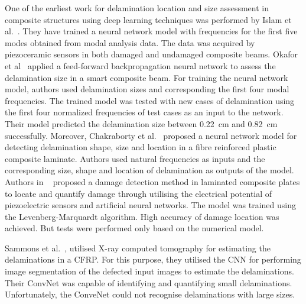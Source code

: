 \documentclass[preprint,9pt]{elsarticle}
\begin{document}
One of the earliest work for delamination location and size assessment in composite structures using deep learning techniques was performed by Islam et al.~\cite{islam1994damage}. 
They have trained a neural network model with frequencies for the first five modes obtained from modal analysis data. 
The data was acquired by piezoceramic sensors in both damaged and undamaged composite beams.
 Okafor et al~\cite{okafor1996delamination} applied a feed-forward backpropagation neural network to assess the delamination size in a smart composite beam. 
 For training the neural network model, authors used delamination sizes and corresponding the first four modal frequencies. 
 The trained model was tested with new cases of delamination using the first four normalized frequencies of test cases as an input to the network. 
 Their model predicted the delamination size between 0.22~cm and 0.82~cm successfully.
 Moreover, Chakraborty et al.~\cite{chakraborty2005artificial} proposed a neural network model for detecting delamination shape, size and location in a fibre reinforced plastic composite laminate.
 Authors used natural frequencies as inputs and the corresponding size, shape and location of delamination as outputs of the model. 
 Authors in ~\cite{roseiro2005neural}  proposed a damage detection method in laminated composite plates to locate and quantify damage through utilising the electrical potential of piezoelectric sensors and artificial neural networks. 
 The model was trained using the Levenberg-Marquardt algorithm. High accuracy of damage location was achieved.
 But tests were performed only based on the numerical model.  

 Sammons et al.~\cite{sammons2016segmenting}, utilised X-ray computed tomography for estimating the delaminations in a CFRP. 
 For this purpose, they utilised the CNN for performing image segmentation of the defected input images to estimate the delaminations. 
 Their ConvNet was capable of identifying and quantifying small delaminations. 
 Unfortunately, the ConveNet could not recognise delaminations with large sizes.
 
\end{document}
